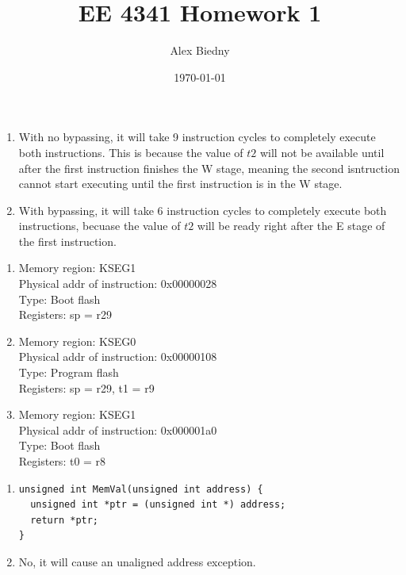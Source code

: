 \documentclass{jhwhw}
\title{EE 4341 Homework 1}
\author{Alex Biedny}
\date{\today}
\begin{document}
\maketitle

\problem{}
\begin{enumerate}
\item With no bypassing, it will take 9 instruction cycles to completely execute both instructions. This is because the value of $t2$ will not be available until after the first instruction finishes the W stage, meaning the second isntruction cannot start executing until the first instruction is in the W stage.
\item With bypassing, it will take 6 instruction cycles to completely execute both instructions, becuase the value of $t2$ will be ready right after the E stage of the first instruction.
\end{enumerate}

\problem{}
\begin{enumerate}
\item Memory region: KSEG1\\
Physical addr of instruction: 0x00000028\\
Type: Boot flash \\
Registers: sp = r29
\item Memory region: KSEG0\\
Physical addr of instruction: 0x00000108\\
Type: Program flash \\
Registers: sp = r29, t1 = r9
\item Memory region: KSEG1\\
Physical addr of instruction: 0x000001a0\\
Type: Boot flash \\
Registers: t0 = r8
\end{enumerate}

\problem{}
\begin{enumerate}
\item \begin{verbatim}
unsigned int MemVal(unsigned int address) {
  unsigned int *ptr = (unsigned int *) address;
  return *ptr;
}
\end{verbatim}
\item No, it will cause an unaligned address exception.
\end{enumerate}
\end{document}
